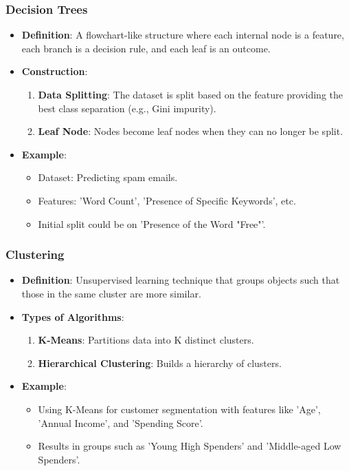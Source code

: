 \documentclass[aspectratio=169]{beamer}
\begin{document}
\begin{frame}
    \frametitle{Decision Trees}
    \begin{itemize}
        \item \textbf{Definition}: A flowchart-like structure where each internal node is a feature, each branch is a decision rule, and each leaf is an outcome.
        \item \textbf{Construction}:
            \begin{enumerate}
                \item \textbf{Data Splitting}: The dataset is split based on the feature providing the best class separation (e.g., Gini impurity).
                \item \textbf{Leaf Node}: Nodes become leaf nodes when they can no longer be split.
            \end{enumerate}
        \item \textbf{Example}: 
            \begin{itemize}
                \item Dataset: Predicting spam emails.
                \item Features: 'Word Count', 'Presence of Specific Keywords', etc.
                \item Initial split could be on 'Presence of the Word "Free"'.
            \end{itemize}
    \end{itemize}
\end{frame}

\begin{frame}
    \frametitle{Clustering}
    \begin{itemize}
        \item \textbf{Definition}: Unsupervised learning technique that groups objects such that those in the same cluster are more similar.
        \item \textbf{Types of Algorithms}:
            \begin{enumerate}
                \item \textbf{K-Means}: Partitions data into K distinct clusters.
                \item \textbf{Hierarchical Clustering}: Builds a hierarchy of clusters.
            \end{enumerate}
        \item \textbf{Example}: 
            \begin{itemize}
                \item Using K-Means for customer segmentation with features like 'Age', 'Annual Income', and 'Spending Score'.
                \item Results in groups such as 'Young High Spenders' and 'Middle-aged Low Spenders'.
            \end{itemize}
    \end{itemize}
\end{frame}
\end{document}

